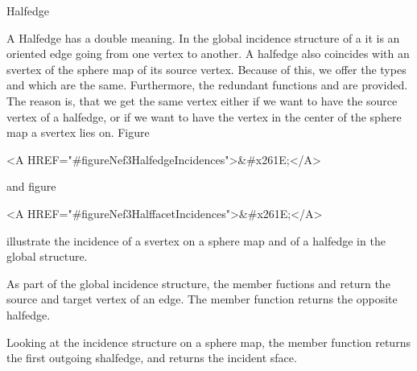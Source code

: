 
\ccRefPageBegin



\begin{ccRefClass}{Halfedge}

\ccDefinition
 
A Halfedge has a double meaning. In the global incidence structure of a
 it is an oriented edge going from one vertex to another.
A halfedge also coincides with an svertex of the sphere map of its source 
vertex. Because of this, we offer the types  and 
which are the same. Furthermore, the redundant functions 
and  are provided. The reason is, that we get the same vertex
either if we want to have the source vertex of a halfedge, or if we want to 
have the vertex in the center of the sphere map a svertex lies on. 
Figure~\begin{ccHtmlOnly}
  <A HREF="#figureNef3HalfedgeIncidences">&#x261E;</A>
\end{ccHtmlOnly} and
figure~\begin{ccHtmlOnly}
  <A HREF="#figureNef3HalffacetIncidences">&#x261E;</A>
\end{ccHtmlOnly} illustrate the incidence of a svertex on a sphere map and of
a halfedge in the global structure. 

As part of the global incidence structure, the member fuctions  
and  return the source and target vertex of an edge. The member
function  returns the opposite halfedge.

Looking at the incidence structure on a sphere map, the member function 
 returns the first outgoing shalfedge, and 
returns the incident sface.


\end{ccRefClass}
